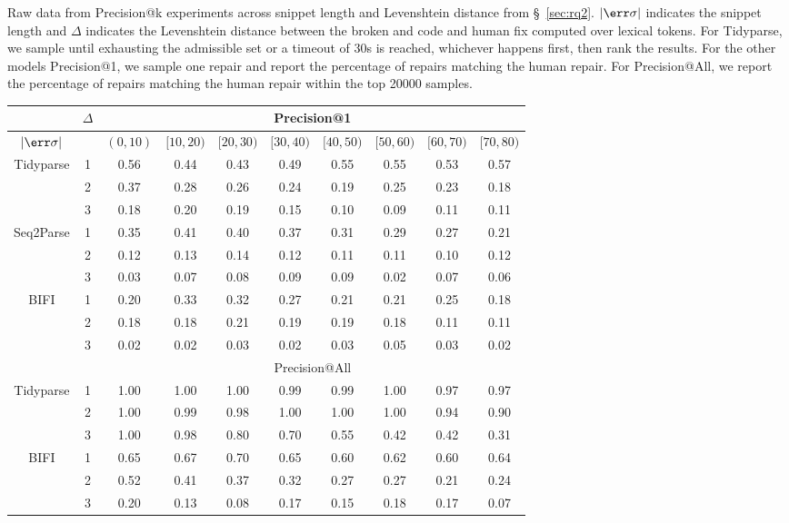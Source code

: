 \documentclass[runningheads]{llncs}
\begin{document}
  Raw data from Precision@k experiments across snippet length and Levenshtein distance from \S~\ref{sec:rq2}. $|\err\sigma|$ indicates the snippet length and $\Delta$ indicates the Levenshtein distance between the broken and code and human fix computed over lexical tokens. For Tidyparse, we sample until exhausting the admissible set or a timeout of 30s is reached, whichever happens first, then rank the results. For the other models Precision@1, we sample one repair and report the percentage of repairs matching the human repair. For Precision@All, we report the percentage of repairs matching the human repair within the top 20000 samples.

  \begin{table}[!h]
    \centering
    \begin{tabular}{c|c|cccccccc}
      \hline\hline
      & $\Delta$ & \multicolumn{8}{c}{Precision@1} \\ \hline
      $|\err\sigma|$ &  & $(0,10)$ & $[10,20)$ & $[20,30)$ & $[30, 40)$ & $[40,50)$ & $[50, 60)$ & $[60,70)$ & $[70, 80)$ \\ \hline
      Tidyparse
      & 1 & 0.56 & 0.44 & 0.43 & 0.49 & 0.55 & 0.55 & 0.53 & 0.57 \\
      & 2 & 0.37 & 0.28 & 0.26 & 0.24 & 0.19 & 0.25 & 0.23 & 0.18 \\
      & 3 & 0.18 & 0.20 & 0.19 & 0.15 & 0.10 & 0.09 & 0.11 & 0.11 \\ \hline
      Seq2Parse
      & 1 & 0.35 & 0.41 & 0.40 & 0.37 & 0.31 & 0.29 & 0.27 & 0.21 \\
      & 2 & 0.12 & 0.13 & 0.14 & 0.12 & 0.11 & 0.11 & 0.10 & 0.12 \\
      & 3 & 0.03 & 0.07 & 0.08 & 0.09 & 0.09 & 0.02 & 0.07 & 0.06 \\ \hline
      BIFI
      & 1 & 0.20 & 0.33 & 0.32 & 0.27 & 0.21 & 0.21 & 0.25 & 0.18 \\
      & 2 & 0.18 & 0.18 & 0.21 & 0.19 & 0.19 & 0.18 & 0.11 & 0.11 \\
      & 3 & 0.02 & 0.02 & 0.03 & 0.02 & 0.03 & 0.05 & 0.03 & 0.02 \\ \hline
      & & \multicolumn{8}{c}{Precision@All} \\ \hline
      Tidyparse
      & 1 & 1.00 & 1.00 & 1.00 & 0.99 & 0.99 & 1.00 & 0.97 & 0.97 \\
      & 2 & 1.00 & 0.99 & 0.98 & 1.00 & 1.00 & 1.00 & 0.94 & 0.90 \\
      & 3 & 1.00 & 0.98 & 0.80 & 0.70 & 0.55 & 0.42 & 0.42 & 0.31 \\ \hline
      BIFI
      & 1 & 0.65 & 0.67 & 0.70 & 0.65 & 0.60 & 0.62 & 0.60 & 0.64 \\
      & 2 & 0.52 & 0.41 & 0.37 & 0.32 & 0.27 & 0.27 & 0.21 & 0.24 \\
      & 3 & 0.20 & 0.13 & 0.08 & 0.17 & 0.15 & 0.18 & 0.17 & 0.07 \\ \hline\hline
    \end{tabular}
  \end{table}
\end{document}

